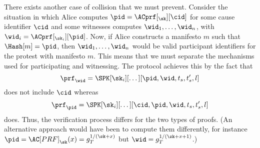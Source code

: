 There exists another case of collision that we must prevent.
Consider the situation in which Alice computes \(\pid = \ACprf[_\sk][\cid]\) for some cause identifier \(\cid\) and some witnesses computes \(\wid_1, \dotsc, \wid_n\), with \(\wid_i = \ACprf[_{\sk_i}][\pid]\).
Now, if Alice constructs a manifesto \(m\) such that \(\Hash[m] = \pid\), then \(\wid_1, \dotsc, \wid_n\) would be valid participant identifiers for the protest with manifesto \(m\).
This means that we must separate the mechanisms used for participating and witnessing.
The protocol achieves this by the fact that \[
  \prf_{\wid} = \SPK[\sk_i][\dotsc][\pid, \wid, t_s, t_s', l]
\]
does not include \(\cid\) whereas \[
  \prf_{\pid} = \SPK[\sk_i][\dotsc][\cid, \pid, \wid, t_s, t_s', l]
\]
does.
Thus, the verification process differs for the two types of proofs.
(An alternative approach would have been to compute them differently, for instance \(\pid = \AC[PRF]_{\sk}(x) = g_T^{1/(\sk+x)}\) but \(\wid = g_T^{1/(\sk+x+1)}\).)

%
%

